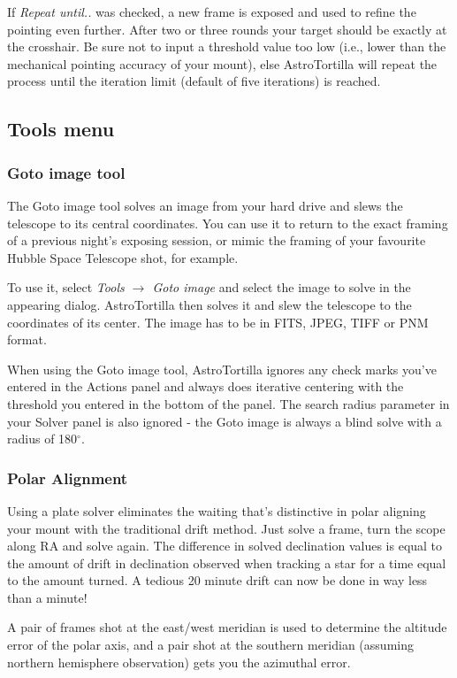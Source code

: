 \documentclass[english]{article}
\begin{document}
If \emph{Repeat until..} was checked, a new frame is exposed and used to refine the pointing 
even further. After two or three rounds your target should be exactly at the crosshair.
Be sure not to input a threshold value too low (i.e., lower than the mechanical pointing accuracy of your mount),
else AstroTortilla will repeat the process until the iteration limit (default of five iterations) is reached.

\subsection{Tools menu}
\subsubsection{Goto image tool}

The Goto image tool solves an image from your hard drive and slews the
telescope to its central coordinates. You can use it to return to the exact
framing of a previous night's exposing session, or mimic the framing of your
favourite Hubble Space Telescope shot, for example.

To use it, select \emph{Tools $\rightarrow$ Goto image} and select the image to
solve in the appearing dialog.  AstroTortilla then solves it and slew the
telescope to the coordinates of its center. The image has to be in FITS, JPEG,
TIFF or PNM format.

When using the Goto image tool, AstroTortilla ignores any check marks you've
entered in the Actions panel and always does iterative centering with the
threshold you entered in the bottom of the panel. The search radius parameter in
your Solver panel is also ignored - the Goto image is always a blind solve with a radius of 180$^\circ$.

\subsubsection{Polar Alignment}

Using a plate solver eliminates the waiting that's distinctive in polar aligning 
your mount with the traditional drift method. Just solve a frame, turn the scope 
along RA and solve again. The difference in solved declination values is equal 
to the amount of drift in declination observed when tracking a star for a time 
equal to the amount turned. A tedious 20 minute drift can now be done in way less than a minute!

A pair of frames shot at the east/west meridian is used to determine the
altitude error of the polar axis, and a pair shot at the southern meridian
(assuming northern hemisphere observation) gets you the azimuthal error.
\end{document}
